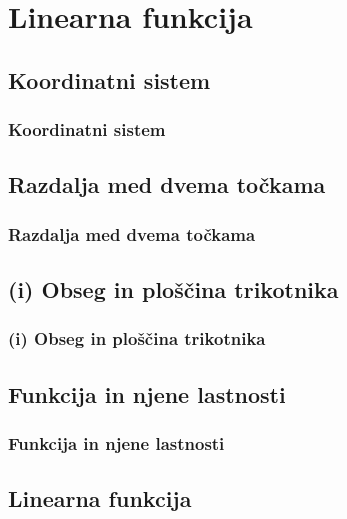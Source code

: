 \section{Linearna funkcija}

\begin{frame}
    \sectionpage
\end{frame}

\begin{frame}
\end{frame}

    \subsection{Koordinatni sistem}

        \begin{frame}
            \frametitle{Koordinatni sistem}
        \end{frame}

    \subsection{Razdalja med dvema točkama}

        \begin{frame}
            \frametitle{Razdalja med dvema točkama}
        \end{frame}

    \subsection{(i) Obseg in ploščina trikotnika}

        \begin{frame}
            \frametitle{(i) Obseg in ploščina trikotnika}
        \end{frame}

    \subsection{Funkcija in njene lastnosti}

        \begin{frame}
            \frametitle{Funkcija in njene lastnosti}
        \end{frame}

    \subsection{Linearna funkcija}

